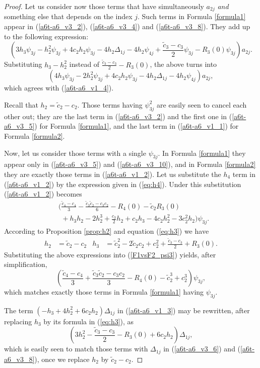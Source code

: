 \begin{proof}
Let us consider now those terms that have simultaneously $a_{2j}$ \emph{and} something else that depends on the index $j$. Such terms in Formula \ref{formula1} appear in (\ref{a6t-a6_v3_2}), (\ref{a6t-a6_v3_4}) and (\ref{a6t-a6_v3_8}). They add up to the following expression:
\[ \left( 3h_3\psi_{3j}-h_2^2\psi_{3j}+4c_2h_2\psi_{3j}-4h_2\Delta_{1j}-4h_2\psi_{4j} +\frac{\tilde{c}_3-c_3}{2}\psi_{3j}-R_3(0)\psi_{3j} \right)a_{2j}. \]
Substituting $h_3-h_2^2$ instead of $\frac{\tilde{c}_3-c_3}{2}-R_3(0)$, the above turns into
\[ \left( 4h_3\psi_{3j}-2h_2^2\psi_{3j}+4c_2h_2\psi_{3j}-4h_2\Delta_{1j}-4h_2\psi_{4j} \right)a_{2j}, \]
which agrees with (\ref{a6t-a6_v1_4}).

Recall that $h_2=\tilde{c}_2-c_2$. Those terms having $\psi_{3j}^2$ are easily seen to cancel each other out; they are the last term in (\ref{a6t-a6_v3_2}) and the first one in (\ref{a6t-a6_v3_5}) for Formula \ref{formula1}, and the last term in (\ref{a6t-a6_v1_1}) for Formula \ref{formula2}.

Now, let us consider those terms with a single $\psi_{3j}$. In Formula \ref{formula1} they appear only in (\ref{a6t-a6_v3_5}) and (\ref{a6t-a6_v3_10}), and in Formula \ref{formula2} they are exactly those terms in (\ref{a6t-a6_v1_2}). Let us substitute the $h_4$ term in (\ref{a6t-a6_v1_2}) by the expression given in (\ref{eq:h4}). Under this substitution (\ref{a6t-a6_v1_2}) becomes
\begin{align}
& \bigg(\frac{\tilde{c}_4-c_4}{3}-\frac{\tilde{c}_3\tilde{c}_2-c_3c_2}{6}-R_4(0)-\tilde{c}_2R_3(0) \nonumber \\
&\phantom{\bigg(} +h_3h_2-2h_2^3+\frac{c_3}{2}h_2+c_2h_3-4c_2h_2^2-3c_2^2h_2\bigg)\psi_{3j}. \label{F1vsF2_psi3}
\end{align}
According to Proposition \ref{prop:h2} and equation (\ref{eq:h3}) we have
\begin{align*}
 h_2&=\tilde{c}_2-c_2 & h_3&=\tilde{c}_2^2-2\tilde{c}_2c_2+c_2^2+\frac{\tilde{c}_3-c_3}{2}+R_3(0).
\end{align*}
Substituting the above expressions into (\ref{F1vsF2_psi3}) yields, after simplification,
\[ \left(\frac{\tilde{c}_4-c_4}{3}+\frac{\tilde{c}_3\tilde{c}_2-c_3c_2}{3}-R_4(0)-\tilde{c}_2^3+c_2^3 \right)\psi_{3j}, \]
which matches exactly those terms in Formula \ref{formula1} having $\psi_{3j}$.

The term $(-h_3+4h_2^2+6c_2h_2)\Delta_{1j}$ in (\ref{a6t-a6_v1_3}) may be rewritten, after replacing $h_3$ by its formula in (\ref{eq:h3}), as
\[ \left( 3h_2^2-\frac{\tilde{c}_3-c_3}{2}-R_3(0)+6c_2h_2\right)\Delta_{1j}, \]
which is easily seen to match those terms with $\Delta_{1j}$ in (\ref{a6t-a6_v3_6}) and (\ref{a6t-a6_v3_8}), once we replace $h_2$ by $\tilde{c}_2-c_2$.


\end{proof}

